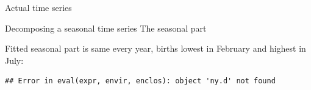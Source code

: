 \documentclass[ignorenonframetext,]{beamer}
\newenvironment{Shaded}{\begin{snugshade}}{\end{snugshade}}
\newcommand{\NormalTok}[1]{#1}
\newcommand{\OperatorTok}[1]{\textcolor[rgb]{0.81,0.36,0.00}{\textbf{#1}}}
\begin{document}
\begin{frame}[fragile]{Actual time series}
\begin{block}{Decomposing a seasonal time series}
The seasonal part

Fitted seasonal part is same every year, births lowest in February and
highest in July:

\begin{Shaded}
\end{Shaded}

\begin{verbatim}
## Error in eval(expr, envir, enclos): object 'ny.d' not found
\end{verbatim}

\end{block}

\end{frame}
\end{document}
